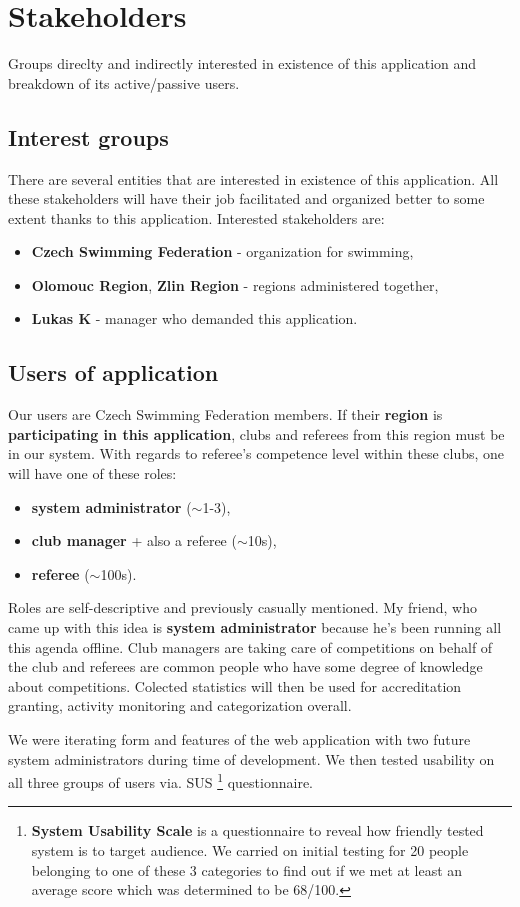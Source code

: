 \section{Stakeholders}
Groups direclty and indirectly interested in existence of this application and breakdown of its active/passive users.
\subsection*{Interest groups}
There are several entities that are interested in existence of this application. All these stakeholders will have their job facilitated and organized better to some extent thanks to this application.  
Interested stakeholders are:
\begin{itemize}
  \item \textbf{Czech Swimming Federation} - organization for swimming,
  \item \textbf{Olomouc Region}, \textbf{Zlin Region} - regions administered together,
  \item \textbf{Lukas K} - manager who demanded this application.
\end{itemize}
\subsection*{Users of application}
Our users are Czech Swimming Federation members. If their \textbf{region} is \textbf{participating in this application}, clubs and referees from this region must be in our system. With regards to referee's competence level within these clubs, one will have one of these roles: 
\begin{itemize}
  \item \textbf{system administrator} ($\sim$1-3),
  \item \textbf{club manager} + also a referee ($\sim$10s),
  \item \textbf{referee} ($\sim$100s).
\end{itemize} 
Roles are self-descriptive and previously casually mentioned. My friend, who came up with this idea is \textbf{system administrator} because he's been running all this agenda offline. Club managers are taking care of competitions on behalf of the club and referees are common people who have some degree of knowledge about competitions. Colected statistics will then be used for accreditation granting, activity monitoring and categorization overall.
\par
We were iterating form and features of the web application with two future system administrators during time of development. We then tested usability on all three groups of users via. SUS \footnote{\textbf{System Usability Scale} is a questionnaire to reveal how friendly tested system is to target audience. We carried on initial testing for 20 people belonging to one of these 3 categories to find out if we met at least an average score which was determined to be 68/100.} questionnaire.
